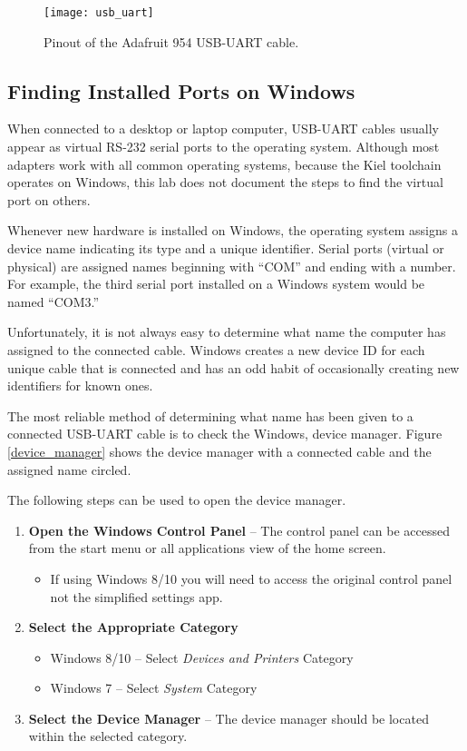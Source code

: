\documentclass[openany,11pt,fleqn]{book} %
\begin{document}
\begin{figure}[]
    \centering\texttt{[image: usb\_uart]}
    \caption{Pinout of the Adafruit 954 USB-UART cable.}
    \label{usb_uart}
\end{figure}

\subsection{Finding Installed Ports on Windows}
When connected to a desktop or laptop computer, USB-UART cables usually appear as virtual RS-232 serial ports to the operating system. Although most adapters work with all common operating systems, because the Kiel toolchain operates on Windows, this lab does not document the steps to find the virtual port on others. 

Whenever new hardware is installed on Windows, the operating system assigns a device name indicating its type and a unique identifier. Serial ports (virtual or physical) are assigned names beginning with ``COM'' and ending with a number. For example, the third serial port installed on a Windows system would be named ``COM3.''

Unfortunately, it is not always easy to determine what name the computer has assigned to the connected cable. Windows creates a new device ID for each unique cable that is connected and has an odd habit of occasionally creating new identifiers for known ones. 

The most reliable method of determining what name has been given to a connected USB-UART cable is to check the Windows, device manager. Figure \ref{device_manager} shows the device manager with a connected cable and the assigned name circled. 

The following steps can be used to open the device manager.

\begin{enumerate}
    \item \textbf{Open the Windows Control Panel} -- The control panel can be accessed from the start menu or all applications view of the home screen.
        \begin{itemize}
            \item If using Windows 8/10 you will need to access the original control panel not the simplified settings app.
        \end{itemize} 
    \item \textbf{Select the Appropriate Category}
     \begin{itemize}
        \item Windows 8/10 -- Select \textit{Devices and Printers} Category
        \item Windows 7 -- Select \textit{System} Category
    \end{itemize} 
    \item \textbf{Select the Device Manager} -- The device manager should be located within the selected category.
\end{enumerate}
\end{document}
